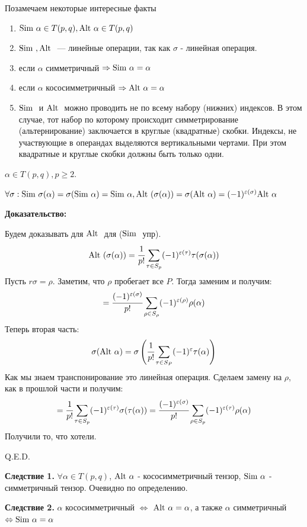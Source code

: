 Позамечаем некоторые интересные факты
\begin{enumerate}
    \item $\text{Sim } \alpha \in T(p,q), \text{Alt } \alpha \in T(p,q) $
    \item $\text{Sim }, \text{Alt }$ --- линейные операции, так как $\sigma$ - линейная операция.
    \item если $\alpha$ симметричный $\Rightarrow \text{Sim } \alpha = \alpha$
    \item  если $\alpha$ кососимметричный $\Rightarrow \text{Alt } \alpha = \alpha$
    \item $\text{Sim }$ и $\text{Alt }$ можно проводить не по всему набору (нижних) индексов. В этом случае, тот набор по которому происходит симметрирование (альтернирование) заключается в круглые (квадратные) скобки. Индексы, не участвующие в операндах выделяются вертикальными чертами. При этом квадратные и круглые скобки должны быть только одни.

\end{enumerate}


$\alpha \in T(p,q), p \geq 2.$

$\forall \sigma: \text{Sim } \sigma(\alpha) = \sigma(\text{Sim } \alpha) = \text{Sim } \alpha, \text{Alt }(\sigma(\alpha)) = \sigma(\text{Alt }\alpha) = (-1)^{\varepsilon(\sigma)}\text{Alt } \alpha$

\textbf{Доказательство:}

Будем доказывать для $\text{Alt }$ для ($\text{Sim }$ упр).
$$\text{Alt } (\sigma(\alpha))=\cfrac{1}{p!}\sum\limits_{\tau\in S_p}(-1)^{\varepsilon(\tau)}\tau(\sigma(\alpha))$$
Пусть $r \sigma = \rho$. Заметим, что $\rho$ пробегает все $P$. Тогда заменим и получим:
$$=  \cfrac{(-1)^{\varepsilon(\sigma)}}{p!}\sum\limits_{\rho \in S_\rho} (-1)^{\varepsilon(\rho)}\rho(\alpha)$$
Теперь вторая часть:
$$\sigma(\text{Alt } \alpha) = \sigma\left(\cfrac{1}{p!}\sum_{\tau\in S_P}(-1)^{\varepsilon}\tau(\alpha)\right)$$
Как мы знаем транспонирование это линейная операция. Сделаем замену на $\rho$, как в прошлой части и получим:
$$= \cfrac{1}{p!}\sum\limits_{\tau \in S_p}(-1)^{\varepsilon(\tau)}\sigma(\tau(\alpha)) = \cfrac{(-1)^{\varepsilon(\sigma)}}{p!}\sum\limits_{\rho \in S_p}(-1)^{\varepsilon(\tau)} \rho(\alpha)$$
Получили то, что хотели.

\hfill Q.E.D.

\textbf{Следствие 1.} $\forall \alpha \in T(p,q)$, $\text{Alt } \alpha$ - кососимметричный тензор, $\text{Sim } \alpha$ - симметричный тензор. Очевидно по определению.

\textbf{Следствие 2.} $\alpha$ кососимметричный $\Leftrightarrow$ $\text{Alt } \alpha= \alpha$, а также $\alpha$ симметричный $\Leftrightarrow \text{Sim } \alpha = \alpha$

